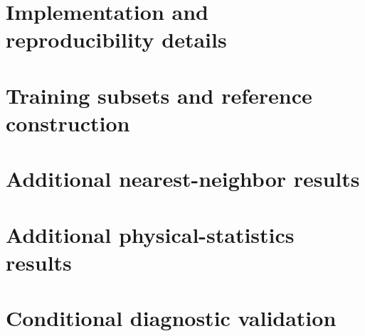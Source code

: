 \section{Implementation and reproducibility details}

\draftplaceholder

\section{Training subsets and reference construction}

\draftplaceholder

\section{Additional nearest-neighbor results}

\draftplaceholder

\section{Additional physical-statistics results}

\draftplaceholder

\section{Conditional diagnostic validation}

\draftplaceholder
